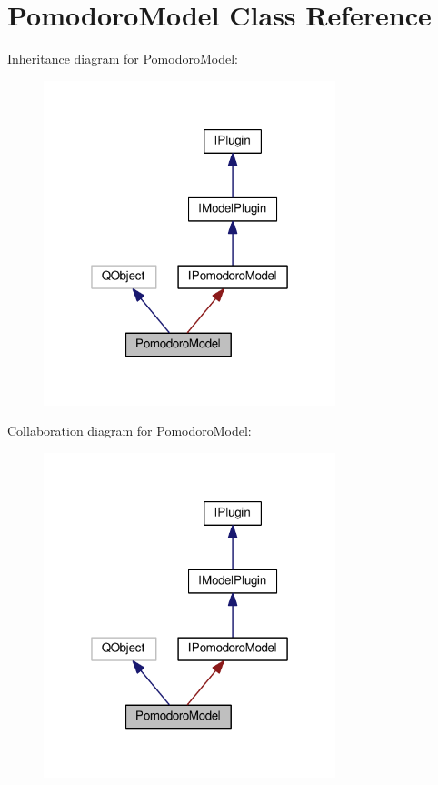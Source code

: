 \hypertarget{class_pomodoro_model}{}\section{Pomodoro\+Model Class Reference}
\label{class_pomodoro_model}


Inheritance diagram for Pomodoro\+Model\+:\nopagebreak
\begin{figure}[H]
\begin{center}
\leavevmode
\includegraphics[width=241pt]{class_pomodoro_model__inherit__graph}
\end{center}
\end{figure}


Collaboration diagram for Pomodoro\+Model\+:\nopagebreak
\begin{figure}[H]
\begin{center}
\leavevmode
\includegraphics[width=241pt]{class_pomodoro_model__coll__graph}
\end{center}
\end{figure}

